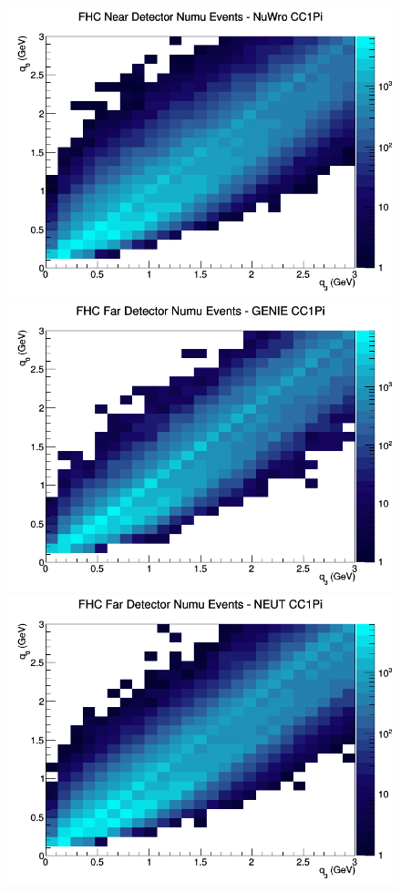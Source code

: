 \begin{figure}[h]
\includegraphics[width=\linewidth]{eff_q0_q3/LAr/CC1Pi_FHC_ND_numu_q3_q0_NuWro.png}
\endminipage
\newline
{}
\includegraphics[width=\linewidth]{eff_q0_q3/LAr/CC1Pi_FHC_FD_numu_q3_q0_GENIE.png}
\endminipage
{}
\includegraphics[width=\linewidth]{eff_q0_q3/LAr/CC1Pi_FHC_FD_numu_q3_q0_NEUT.png}

\end{figure}
